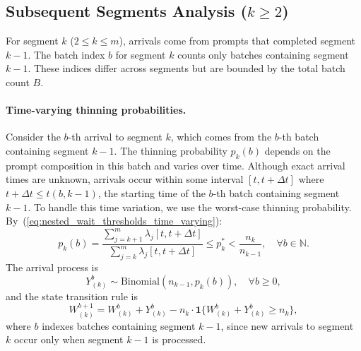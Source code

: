 \subsection{Subsequent Segments Analysis ($k \geq 2$)}

For segment $k$ ($2\leq k\leq m$), arrivals come from prompts that completed segment $k-1$. The batch index $b$ for segment $k$ counts only batches containing segment $k-1$. These indices differ across segments but are bounded by the total batch count $B$.

\paragraph{Time-varying thinning probabilities.} Consider the $b$-th arrival to segment $k$, which comes from the $b$-th batch containing segment $k-1$. The thinning probability $p_k(b)$ depends on the prompt composition in this batch and varies over time. Although exact arrival times are unknown, arrivals occur within some interval $[t, t+\Delta t]$ where $t+\Delta t \leq t(b,k-1)$, the starting time of the $b$-th batch containing segment $k-1$. To handle this time variation, we use the worst-case thinning probability. By~(\ref{eq:nested_wait_thresholds_time_varying}):
$$p_k(b) = \frac{\sum_{j=k+1}^m \lambda_j[ t, t+\Delta t ]}{\sum_{j=k}^m \lambda_j[ t, t+\Delta t ]}\leq p_k^* < \frac{n_k}{n_{k-1}}, \quad \forall b \in \mathbb{N}.$$
The arrival process is
$$Y_{(k)}^b \sim \text{Binomial}(n_{k-1},p_k(b)),\quad \forall b\geq 0,$$
and the state transition rule is
$$W_{(k)}^{b+1} = W_{(k)}^{b} + Y_{(k)}^{b} - n_k \cdot\mathbf{1}\{ W_{(k)}^{b} + Y_{(k)}^{b}\geq n_k \}, $$
where $b$ indexes batches containing segment $k-1$, since new arrivals to segment $k$ occur only when segment $k-1$ is processed.


